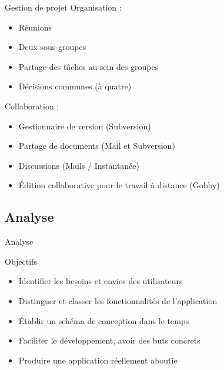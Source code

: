 \documentclass{beamer}
\begin{document}
		\begin{frame}{Gestion de projet}
		Organisation :
			\begin{itemize}
				\item{Réunions}
				\item{Deux sous-groupes}
				\item{Partage des tâches au sein des groupes}
				\item{Décisions communes (à quatre)}
			\end{itemize}
		
		Collaboration :
			\begin{itemize}
				\item{Gestionnaire de version (Subversion)}
				\item{Partage de documents (Mail et Subversion)}
				\item{Discussions (Mails / Instantanée)}
				\item{Édition collaborative pour le travail à distance (Gobby)}
			\end{itemize}
		\end{frame}
		
	\subsection{Analyse}
		\begin{frame}{Analyse}
			\begin{exampleblock}{Objectifs}
				\begin{itemize}
					\item{Identifier les besoins et envies des utilisateurs}
					\item{Distinguer et classer les fonctionnalités de l'application}
					\item{Établir un schéma de conception dans le temps}
					\item{Faciliter le développement, avoir des buts concrets}
					\item{Produire une application réellement aboutie}
				\end{itemize}
			\end{exampleblock}
		\end{frame}
	
\end{document}
